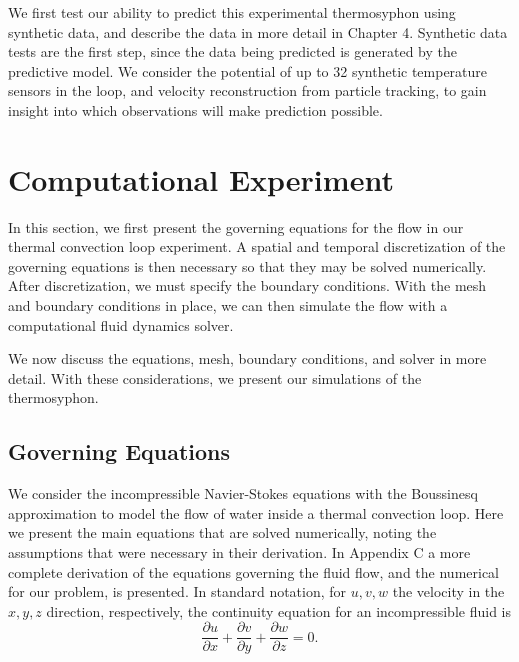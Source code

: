 \documentclass[12pt]{report}
\begin{document}
We first test our ability to predict this experimental thermosyphon using synthetic data, and describe the data in more detail in Chapter 4.
Synthetic data tests are the first step, since the data being predicted is generated by the predictive model.
We consider the potential of up to 32 synthetic temperature sensors in the loop, and velocity reconstruction from particle tracking, to gain insight into which observations will make prediction possible.

\section{Computational Experiment}
In this section, we first present the governing equations for the flow in our thermal convection loop experiment.
A spatial and temporal discretization of the governing equations is then necessary so that they may be solved numerically.
After discretization, we must specify the boundary conditions.
With the mesh and boundary conditions in place, we can then simulate the flow with a computational fluid dynamics solver.

We now discuss the equations, mesh, boundary conditions, and solver in more detail.
With these considerations, we present our simulations of the thermosyphon.

\subsection{Governing Equations}
We consider the incompressible Navier-Stokes equations with the Boussinesq approximation to model the flow of water inside a thermal convection loop.
Here we present the main equations that are solved numerically, noting the assumptions that were necessary in their derivation.
In Appendix C a more complete derivation of the equations governing the fluid flow, and the numerical for our problem, is presented.
In standard notation, for $u,v,w$ the velocity in the $x,y,z$ direction, respectively, the continuity equation for an incompressible fluid is
\begin{equation} \frac{\partial u}{\partial x} + \frac{\partial v}{\partial y} + \frac{\partial w}{\partial z} = 0. \label{eq:NScontIco} \end{equation}
\end{document}
